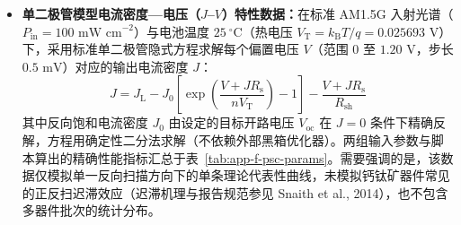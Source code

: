 \begin{itemize}
  \item \textbf{单二极管模型电流密度—电压（$J$--$V$）特性数据：}在标准 AM1.5G 入射光谱（$P_{\mathrm{in}} = 100\text{ mW cm}^{-2}$）与电池温度 $25\ ^\circ\text{C}$（热电压 $V_{\mathrm{T}} = k_{\mathrm{B}}T/q = 0.025693\text{ V}$）下，采用标准单二极管隐式方程求解每个偏置电压 $V$（范围 $0$ 至 $1.20\text{ V}$，步长 $0.5\text{ mV}$）对应的输出电流密度 $J$：
  \[
    J = J_{\mathrm{L}} - J_0 \left[\exp\!\left(\frac{V + J R_{\mathrm{s}}}{n V_{\mathrm{T}}}\right) - 1\right] - \frac{V + J R_{\mathrm{s}}}{R_{\mathrm{sh}}}
  \]
  其中反向饱和电流密度 $J_0$ 由设定的目标开路电压 $V_{\mathrm{oc}}$ 在 $J=0$ 条件下精确反解，方程用确定性二分法求解（不依赖外部黑箱优化器）。两组输入参数与脚本算出的精确性能指标汇总于表~\ref{tab:app-f-psc-params}。需要强调的是，该数据仅模拟单一反向扫描方向下的单条理论代表性曲线，未模拟钙钛矿器件常见的正反扫迟滞效应（迟滞机理与报告规范参见 Snaith et al., 2014），也不包含多器件批次的统计分布。

\begin{table}[htbp]
\centering
\caption{钙钛矿太阳能电池单二极管模型参数与输出性能指标汇总表}\label{tab:app-f-psc-params}
\end{table}


\end{itemize}
